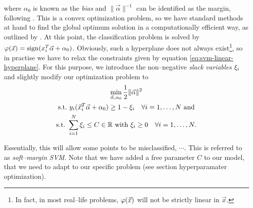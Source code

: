 where $\alpha_0$ is known as the \emph{bias} and $\|\vec \alpha \|^{-1}$ can be identified as the margin, following \citet{hastie2001}. This is a convex optimization problem, so we have standard methods at hand to find the global optimum solution in a computationally efficient way, as outlined by \citet{vanderplas2015}. At this point, the classification problem is solved by $\varphi(\vec x) = \operatorname{sign}(x_i^T \vec \alpha + \alpha_0)$. Obviously, such a hyperplane does not always exist\footnote{In fact, in most real--life problems, $\varphi(\vec x)$ will not be strictly linear in $\vec x$.}, so in practise we have to relax the constraints given by equation \eqref{eq:svm-linear-hyperplane}. For this purpose, we introduce the non--negative \emph{slack variables} $\xi_i$ and slightly modify our optimization problem to \\


\begin{gather}
\label{eq:svm-linear-hyperplane-relaxed}
\min_{\vec \alpha, \alpha_0} \frac{1}{2} \| \vec \alpha \|^2 \\
\text{\st} y_i (\vec x_i^T \vec \alpha + \alpha_0) \ge 1 - \slack_i \quad \forall i = 1, \ldots, N \text{\ and} \\
\text{\st} \sum\limits_{i=1}^{N} \slack_i \le C \in \mathbb{R} \text{\ with\ } \slack_i \ge 0 \quad \forall i = 1, \ldots, N.
\end{gather}

Essentially, this will allow some points to be misclassified, $\cdots$. This is referred to as \emph{soft--margin SVM}. Note that we have added a free parameter $C$ to our model, that we need to adapt to our specific problem (see section hyperparamater optimization).\\

